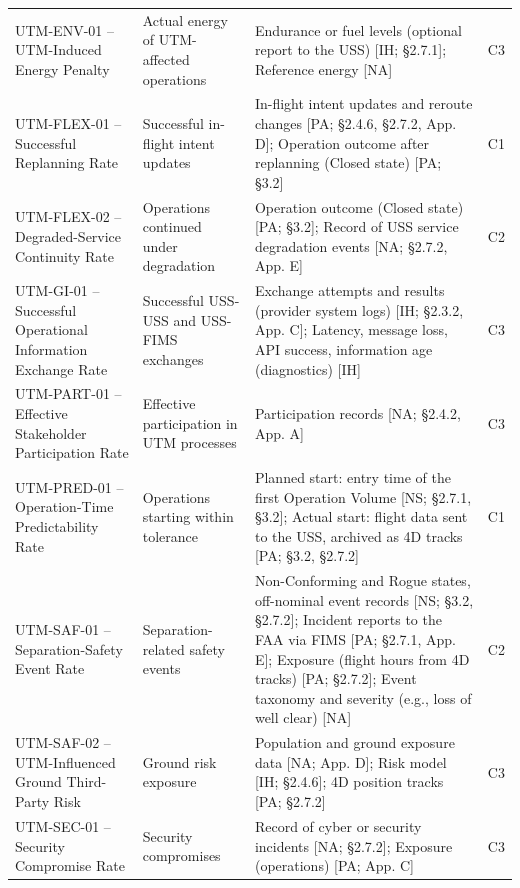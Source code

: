 \begin{table}[!t]
\begin{tabularx}{\textwidth}{@{}>{\raggedright\arraybackslash}p{}>{\raggedright\arraybackslash}p{}>{\raggedright\arraybackslash}X>{\centering\arraybackslash}p{}@{}}
UTM-ENV-01 -- UTM-Induced Energy Penalty & Actual energy of UTM-affected operations & Endurance or fuel levels (optional report to the USS) [IH; \S{}2.7.1]; Reference energy [NA] & C3 \\
UTM-FLEX-01 -- Successful Replanning Rate & Successful in-flight intent updates & In-flight intent updates and reroute changes [PA; \S{}2.4.6, \S{}2.7.2, App. D]; Operation outcome after replanning (Closed state) [PA; \S{}3.2] & C1 \\
UTM-FLEX-02 -- Degraded-Service Continuity Rate & Operations continued under degradation & Operation outcome (Closed state) [PA; \S{}3.2]; Record of USS service degradation events [NA; \S{}2.7.2, App. E] & C2 \\
UTM-GI-01 -- Successful Operational Information Exchange Rate & Successful USS-USS and USS-FIMS exchanges & Exchange attempts and results (provider system logs) [IH; \S{}2.3.2, App. C]; Latency, message loss, API success, information age (diagnostics) [IH] & C3 \\
UTM-PART-01 -- Effective Stakeholder Participation Rate & Effective participation in UTM processes & Participation records [NA; \S{}2.4.2, App. A] & C3 \\
UTM-PRED-01 -- Operation-Time Predictability Rate & Operations starting within tolerance & Planned start: entry time of the first Operation Volume [NS; \S{}2.7.1, \S{}3.2]; Actual start: flight data sent to the USS, archived as 4D tracks [PA; \S{}3.2, \S{}2.7.2] & C1 \\
UTM-SAF-01 -- Separation-Safety Event Rate & Separation-related safety events & Non-Conforming and Rogue states, off-nominal event records [NS; \S{}3.2, \S{}2.7.2]; Incident reports to the FAA via FIMS [PA; \S{}2.7.1, App. E]; Exposure (flight hours from 4D tracks) [PA; \S{}2.7.2]; Event taxonomy and severity (e.g., loss of well clear) [NA] & C2 \\
UTM-SAF-02 -- UTM-Influenced Ground Third-Party Risk & Ground risk exposure & Population and ground exposure data [NA; App. D]; Risk model [IH; \S{}2.4.6]; 4D position tracks [PA; \S{}2.7.2] & C3 \\
UTM-SEC-01 -- Security Compromise Rate & Security compromises & Record of cyber or security incidents [NA; \S{}2.7.2]; Exposure (operations) [PA; App. C] & C3 \\
\bottomrule
\end{tabularx}
\end{table}
